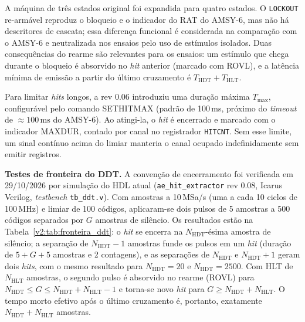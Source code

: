 A máquina de três estados original foi expandida para quatro estados. O \texttt{LOCKOUT} re-armável reproduz o bloqueio e o indicador do RAT do AMSY-6, mas não há descritores de cascata; essa diferença funcional é considerada na comparação com o AMSY-6 e neutralizada nos ensaios pelo uso de estímulos isolados. Duas consequências do rearme são relevantes para os ensaios: um estímulo que chega durante o bloqueio é absorvido no \textit{hit} anterior (marcado com ROVL), e a latência mínima de emissão a partir do último cruzamento é \(T_{\mathrm{HDT}} + T_{\mathrm{HLT}}\).

Para limitar \textit{hits} longos, a rev 0.06 introduziu uma duração máxima \(T_{\max}\), configurável pelo comando SETHITMAX (padrão de 100\,ms, próximo do \textit{timeout} de \(\approx 100\,\mathrm{ms}\) do AMSY-6). Ao atingi-la, o \textit{hit} é encerrado e marcado com o indicador MAXDUR, contado por canal no registrador \texttt{HITCNT}. Sem esse limite, um sinal contínuo acima do limiar manteria o canal ocupado indefinidamente sem emitir registros.

\textbf{Testes de fronteira do DDT.} A convenção de encerramento foi verificada em 29/10/2026 por simulação do HDL atual (\texttt{ae\_hit\_extractor} rev 0.08, Icarus Verilog, \textit{testbench} \texttt{tb\_ddt.v}). Com amostras a 10\,MSa/s (uma a cada 10 ciclos de 100\,MHz) e limiar de 100 códigos, aplicaram-se dois pulsos de 5 amostras a 500 códigos separados por \(G\) amostras de silêncio. Os resultados estão na Tabela~\ref{v2:tab:fronteira_ddt}: o \textit{hit} se encerra na \(N_{\mathrm{HDT}}\)-ésima amostra de silêncio; a separação de \(N_{\mathrm{HDT}}-1\) amostras funde os pulsos em um \textit{hit} (duração de \(5+G+5\) amostras e 2 contagens), e as separações de \(N_{\mathrm{HDT}}\) e \(N_{\mathrm{HDT}}+1\) geram dois \textit{hits}, com o mesmo resultado para \(N_{\mathrm{HDT}} = 20\) e \(N_{\mathrm{HDT}} = 2500\). Com HLT de \(N_{\mathrm{HLT}}\) amostras, o segundo pulso é absorvido no rearme (ROVL) para \(N_{\mathrm{HDT}} \le G \le N_{\mathrm{HDT}} + N_{\mathrm{HLT}} - 1\) e torna-se novo \textit{hit} para \(G \ge N_{\mathrm{HDT}} + N_{\mathrm{HLT}}\). O tempo morto efetivo após o último cruzamento é, portanto, exatamente \(N_{\mathrm{HDT}} + N_{\mathrm{HLT}}\) amostras.


